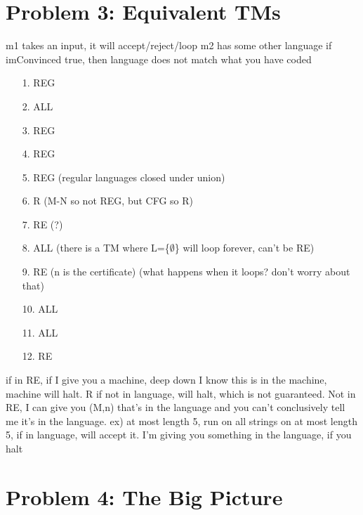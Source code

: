 \documentclass[10pt,letter]{article}
\begin{document}
\section*{Problem 3: Equivalent TMs}
m1 takes an input, it will accept/reject/loop
m2 has some other language
if imConvinced true, then language does not match what you have coded


\begin{enumerate}
\item[1.] REG
\item[2.] ALL
\item[3.] REG
\item[4.] REG
\item[5.] REG (regular languages closed under union)
\item[6.] R (M-N so not REG, but CFG so R)
\item[7.] RE (?)
\item[8.] ALL (there is a TM where L=\{$\emptyset$\} will loop forever, can't be RE)
\item[9.] RE (n is the certificate) (what happens when it loops? don't worry about that)
\item[10.] ALL
\item[11.] ALL
\item[12.] RE 
\end{enumerate}
if in RE, if I give you a machine, deep down I know this is in the machine, machine will halt. R if not in language, will halt, which is not guaranteed. Not in RE, I can give you (M,n) that's in the language and you can't conclusively tell me it's in the language. ex) at most length 5, run on all strings on at most length 5, if in language, will accept it. I'm giving you something in the language, if you halt

\section*{Problem 4: The Big Picture}
\end{document}
